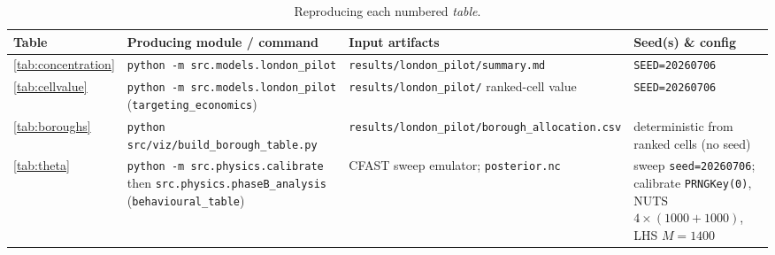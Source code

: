 \begin{table}[htbp]
  \centering
  \small
  \setlength{\tabcolsep}{4pt}
  \caption{Reproducing each numbered \emph{table}.}
  \label{tab:repro-tab2}
  \begin{tabular}{@{}p{1.6cm}p{4.6cm}p{4.0cm}p{4.0cm}@{}}
    \toprule
    Table & Producing module / command & Input artifacts & Seed(s) \& config \\
    \midrule
    \ref{tab:concentration} & \texttt{python -m src.models.london\_pilot}
      & \texttt{results/london\_pilot/summary.md} & \texttt{SEED=20260706} \\
    \ref{tab:cellvalue} & \texttt{python -m src.models.london\_pilot}
      (\texttt{targeting\_economics}) & \texttt{results/london\_pilot/}
      ranked-cell value & \texttt{SEED=20260706} \\
    \ref{tab:boroughs} & \texttt{python src/viz/build\_borough\_table.py}
      & \texttt{results/london\_pilot/borough\_allocation.csv}
      & deterministic from ranked cells (no seed) \\
    \ref{tab:theta} & \texttt{python -m src.physics.calibrate} then
      \texttt{src.physics.phaseB\_analysis} (\texttt{behavioural\_table})
      & CFAST sweep emulator; \texttt{posterior.nc}
      & sweep \texttt{seed=20260706}; calibrate \texttt{PRNGKey(0)},
      NUTS $4\times(1000{+}1000)$, LHS $M{=}1400$ \\
    \bottomrule
  \end{tabular}
\end{table}
